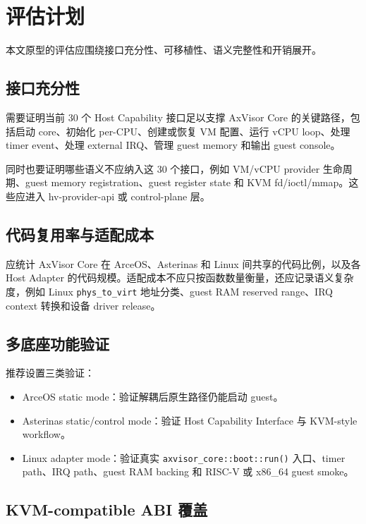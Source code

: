 \documentclass[a4paper,11pt]{article}
\begin{document}
\section{评估计划}

本文原型的评估应围绕接口充分性、可移植性、语义完整性和开销展开。

\subsection{接口充分性}

需要证明当前 30 个 Host Capability 接口足以支撑 AxVisor Core 的关键路径，包括启动 core、初始化 per-CPU、创建或恢复 VM 配置、运行 vCPU loop、处理 timer event、处理 external IRQ、管理 guest memory 和输出 guest console。

同时也要证明哪些语义不应纳入这 30 个接口，例如 VM/vCPU provider 生命周期、guest memory registration、guest register state 和 KVM fd/ioctl/mmap。这些应进入 hv-provider-api 或 control-plane 层。

\subsection{代码复用率与适配成本}

应统计 AxVisor Core 在 ArceOS、Asterinas 和 Linux 间共享的代码比例，以及各 Host Adapter 的代码规模。适配成本不应只按函数数量衡量，还应记录语义复杂度，例如 Linux \texttt{phys\_to\_virt} 地址分类、guest RAM reserved range、IRQ context 转换和设备 driver release。

\subsection{多底座功能验证}

推荐设置三类验证：

\begin{itemize}
  \item ArceOS static mode：验证解耦后原生路径仍能启动 guest。
  \item Asterinas static/control mode：验证 Host Capability Interface 与 KVM-style workflow。
  \item Linux adapter mode：验证真实 \texttt{axvisor\_core::boot::run()} 入口、timer path、IRQ path、guest RAM backing 和 RISC-V 或 x86\_64 guest smoke。
\end{itemize}

\subsection{KVM-compatible ABI 覆盖}
\end{document}
